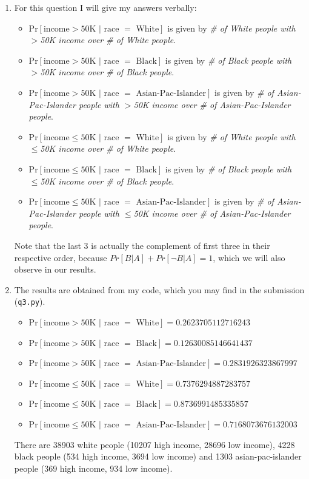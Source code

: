 \documentclass[12pt,reqno]{amsart}
\newcommand{\code}[1]{\texttt{#1}}
\begin{document}
\begin{enumerate}[label=\alph*.]
 	\item For this question I will give my answers verbally:
 	\begin{itemize}
 		\item $\text{Pr}[\text{income}>50\text{K }|\text{ race }=\text{ White}]$ is given by \textit{\# of White people with $>$50K income over \# of White people}.
 		\item $\text{Pr}[\text{income}>50\text{K }|\text{ race }=\text{ Black}]$ is given by \textit{\# of Black people with $>$50K income over \# of Black people}.
 		\item $\text{Pr}[\text{income}>50\text{K }|\text{ race }=\text{ Asian-Pac-Islander}]$ is given by \textit{\# of Asian-Pac-Islander people with $>$50K income over \# of Asian-Pac-Islander people}.
 		\item $\text{Pr}[\text{income}\leq50\text{K }|\text{ race }=\text{ White}]$ is given by \textit{\# of White people with $\leq$50K income over \# of White people}.
 		\item $\text{Pr}[\text{income}\leq50\text{K }|\text{ race }=\text{ Black}]$ is given by \textit{\# of Black people with $\leq$50K income over \# of Black people}.
 		\item $\text{Pr}[\text{income}\leq50\text{K }|\text{ race }=\text{ Asian-Pac-Islander}]$ is given by \textit{\# of Asian-Pac-Islander people with $\leq$50K income over \# of Asian-Pac-Islander people}.
 	\end{itemize}
	Note that the last 3 is actually the complement of first three in their respective order, because $Pr[B | A] + Pr[\neg B | A] = 1$, which we will also observe in our results. 
 	
 	\item The results are obtained from my code, which you may find in the submission (\code{q3.py}).
 	\begin{itemize}
 		\item $\text{Pr}[\text{income}>50\text{K }|\text{ race }=\text{ White}] = 0.2623705112716243$
 		\item $\text{Pr}[\text{income}>50\text{K }|\text{ race }=\text{ Black}] = 0.12630085146641437$  
 		\item $\text{Pr}[\text{income}>50\text{K }|\text{ race }=\text{ Asian-Pac-Islander}] = 0.2831926323867997$  
 		\item $\text{Pr}[\text{income}\leq50\text{K }|\text{ race }=\text{ White}] = 0.7376294887283757$ 
 		\item $\text{Pr}[\text{income}\leq50\text{K }|\text{ race }=\text{ Black}] = 0.8736991485335857$  
 		\item $\text{Pr}[\text{income}\leq50\text{K }|\text{ race }=\text{ Asian-Pac-Islander}] = 0.7168073676132003$ 
 	\end{itemize}
 	There are 38903 white people (10207 high income, 28696 low income), 4228 black people (534 high income, 3694 low income) and 1303 asian-pac-islander people (369 high income, 934 low income).
 	

\end{enumerate}
\end{document}

